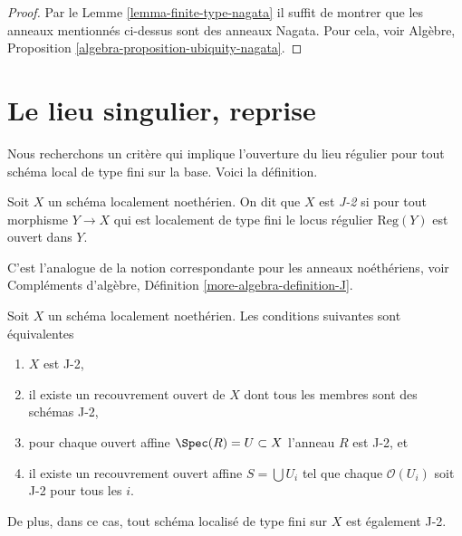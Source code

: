 \begin{proof}
Par le Lemme \ref{lemma-finite-type-nagata} il suffit de montrer que les anneaux
mentionnés ci-dessus sont des anneaux Nagata.
Pour cela, voir Algèbre, Proposition \ref{algebra-proposition-ubiquity-nagata}.
\end{proof}


\section{Le lieu singulier, reprise}
\label{section-singular-locus}

\noindent
Nous recherchons un critère qui implique l'ouverture du lieu régulier
pour tout schéma local de type fini sur la base. Voici la définition.

\begin{definition}
\label{definition-J}
Soit $X$ un schéma localement noethérien. On dit que $X$ est {\it
J-2} si pour tout morphisme $Y \to X$ qui est localement de type
fini le locus régulier $\text{Reg}(Y)$ est ouvert dans $Y$.
\end{definition}

\noindent
C'est l'analogue de la notion correspondante pour les anneaux noéthériens,
voir Compléments d'algèbre, Définition \ref{more-algebra-definition-J}.

\begin{lemma}
\label{lemma-J}
Soit $X$ un schéma localement noethérien. Les conditions suivantes sont équivalentes
\begin{enumerate}
\item $X$ est J-2,
\item il existe un recouvrement ouvert de $X$ dont tous les membres sont des
schémas J-2,
\item pour chaque ouvert affine $\Spec(R) = U \subset X$ l'anneau $R$
est J-2, et
\item il existe un recouvrement ouvert affine $S = \bigcup U_i$ tel que chaque
$\mathcal{O}(U_i)$ soit J-2 pour tous les $i$.
\end{enumerate}
De plus, dans ce cas, tout schéma localisé de type fini sur $X$ est
également J-2.
\end{lemma}

